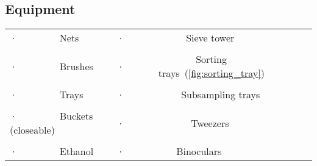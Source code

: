 \begin{figure}[!htb]                               %
\centering                                                                  %
  \hfill                                                                                    %
  \hspace*{\fill}                                                                    %
\end{figure}




\subsection{Equipment}\label{sec:equipment}                 %


\begin{table}[htbp]
  \centering
    \begin{tabular}{l b{3cm} l}
    ·         Nets & ·   &      Sieve tower \\
                &   &\\
    ·         Brushes & · &        Sorting trays~(\cref{fig:sorting_tray}) \\
                &   &\\
    ·         Trays & ·    &     Subsampling trays \\
                &   &\\
    ·         Buckets (closeable) & ·  &       Tweezers \\
                &   &\\
    ·         Ethanol & ·     &    Binoculars \\
    \end{tabular}%
  \label{tab:addlabel}%
\end{table}%


